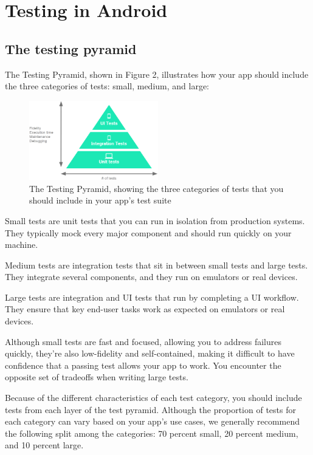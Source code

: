 
\chapter{Testing in Android}

\section{The testing pyramid}
The Testing Pyramid, shown in Figure 2, illustrates how your app should include the three categories of tests: small, medium, and large:

\begin{figure}[h]
	\centering
	\includegraphics[width = 0.5\textwidth]{images/testing/pyramid}
	\caption{The Testing Pyramid, showing the three categories of tests that you should include in your app's test suite}
\end{figure}


Small tests are unit tests that you can run in isolation from production systems. They typically mock every major component and should run quickly on your machine.


Medium tests are integration tests that sit in between small tests and large tests. They integrate several components, and they run on emulators or real devices.


Large tests are integration and UI tests that run by completing a UI workflow. They ensure that key end-user tasks work as expected on emulators or real devices.


Although small tests are fast and focused, allowing you to address failures quickly, they're also low-fidelity and self-contained, making it difficult to have confidence that a passing test allows your app to work. You encounter the opposite set of tradeoffs when writing large tests.

Because of the different characteristics of each test category, you should include tests from each layer of the test pyramid. Although the proportion of tests for each category can vary based on your app's use cases, we generally recommend the following split among the categories: 70 percent small, 20 percent medium, and 10 percent large.

